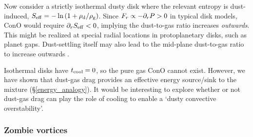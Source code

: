 
Now consider a strictly isothermal dusty disk where the relevant 
entropy is dust-induced, $S_\mathrm{eff} =-\ln{(1+\rho_\mathrm{d}/\rho_\mathrm{g})}$. 
Since $F_r\propto -\partial_rP > 0$ in typical disk models, ConO would
require $\partial_rS_\mathrm{eff}<0$, implying the dust-to-gas ratio increases
\emph{outwards}. This might be realized at special radial locations in 
protoplanetary disks, such as planet gaps. Dust-settling itself may
also lead to the mid-plane dust-to-gas ratio to increase outwards
\citep{takeuchi02}. 


Isothermal disks have $t_\mathrm{cool}=0$, so the pure gas ConO cannot
exist. However, we have shown that dust-gas drag provides an effective
energy source/sink to the mixture (\S\ref{energy_analogy}). It would be
interesting to explore whether or not dust-gas drag can play the role
of cooling to enable a `dusty convective 
overstability'. 







\subsubsection{Zombie vortices}

